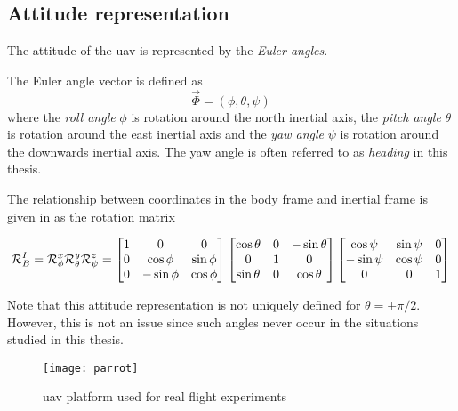 \subsection{Attitude representation}
The attitude of the \ac{uav} is represented by the \textit{Euler angles}. 

\begin{definition}
The Euler angle vector is defined as
\begin{equation}
    \vec{\Phi}=(\phi, \theta, \psi)
\end{equation}
where the \textit{roll angle} $\phi$ is rotation around the north inertial axis, 
the \textit{pitch angle} $\theta$ is rotation around the east inertial axis and
the \textit{yaw angle} $\psi$ is rotation around the downwards inertial axis. The yaw angle is often 
referred to as \textit{heading} in this thesis.

The relationship between coordinates in the body frame and inertial frame is given
in \cite{sensor_fusion} as the rotation matrix 

\begin{equation}\label{eq:r_i_b}
\mathcal{R}^I_B = \mathcal{R}^x_\phi\mathcal{R}^y_\theta\mathcal{R}^z_\psi\\
=
\begin{bmatrix}
    1 & 0 & 0 \\
    0 & \cos\phi & \sin\phi \\
    0 & -\sin\phi & \cos\phi
\end{bmatrix}
\begin{bmatrix}
    \cos\theta & 0 & -\sin\theta \\
    0 & 1 & 0 \\
    \sin\theta & 0 & \cos\theta
\end{bmatrix}      
\begin{bmatrix}
    \cos\psi & \sin\psi & 0 \\
    -\sin\psi & \cos\psi & 0 \\
    0 & 0 & 1
\end{bmatrix}
\end{equation}  
\end{definition}

\noindent Note that this attitude representation is not uniquely defined for $\theta=\pm\pi/2$. However, this is not an issue since such angles 
never occur in the situations studied in this thesis.
\begin{figure}
    \centering
    \texttt{[image: parrot]}
    \caption{\ac{uav} platform used for real flight experiments}
    \label{fig:parrot}
\end{figure}
